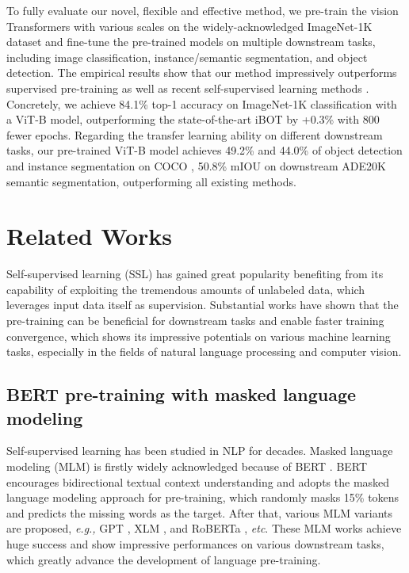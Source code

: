 \documentclass[runningheads]{llncs}
\begin{document}
To fully evaluate our novel, flexible and effective method, we pre-train the vision Transformers with various scales on the widely-acknowledged ImageNet-1K \cite{imagenet1k} dataset and fine-tune the pre-trained models on multiple downstream tasks, including image classification, instance/semantic segmentation, and object detection. 
The empirical results show that our method impressively outperforms supervised pre-training as well as recent self-supervised learning methods \cite{mocov3,dino,beit,ibot}. 
Concretely, we achieve 84.1\% top-1 accuracy on ImageNet-1K classification with a ViT-B model, outperforming the state-of-the-art iBOT \cite{ibot} by +0.3\% with 800 fewer epochs.
Regarding the transfer learning ability on different downstream tasks, our pre-trained ViT-B model achieves 49.2\%  and 44.0\%  of object detection and instance segmentation on COCO \cite{coco}, 50.8\% mIOU on downstream ADE20K \cite{ade20k} semantic segmentation, outperforming all existing methods.


\section{Related Works}
Self-supervised learning (SSL) has gained great popularity benefiting from its capability of exploiting the tremendous
amounts of unlabeled data, which leverages input data itself as supervision. Substantial works \cite{moco,simclr,beit,BERT,GPT3,miles,liu2021self,cpc,decpc} have shown that the pre-training can be beneficial for downstream tasks and enable faster training convergence, which shows its impressive potentials on various machine learning tasks, especially in the fields of natural language processing and computer vision.


\subsection{BERT pre-training with masked language modeling} 
Self-supervised learning has been studied in NLP for decades. 
Masked language modeling (MLM) is firstly widely acknowledged because of BERT \cite{BERT}.
BERT encourages bidirectional textual context understanding and adopts the masked language modeling approach for pre-training, which randomly masks 15\% tokens and predicts the missing words as the target. After that, various MLM variants are proposed, \textit{e.g.,} GPT \cite{GPT3}, XLM \cite{xlm}, and RoBERTa \cite{roberta}, \textit{etc}. These MLM works achieve huge success and show impressive performances on various downstream tasks, which greatly advance the development of language pre-training.
\end{document}
